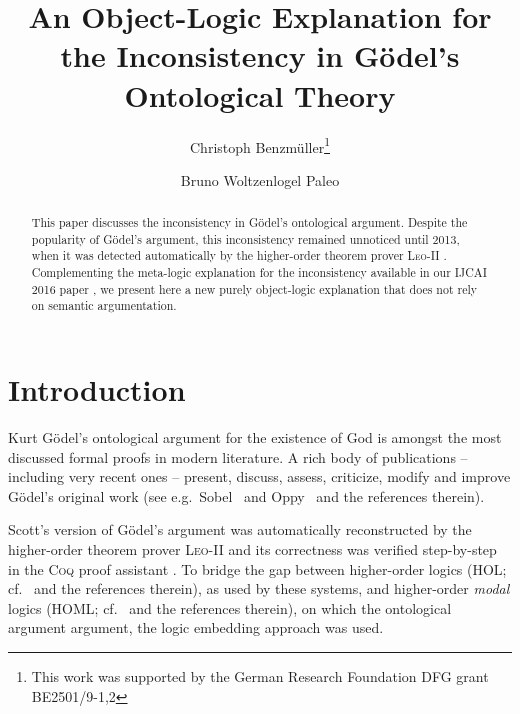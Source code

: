 \documentclass{llncs}
\begin{document}
\title{An Object-Logic Explanation for the Inconsistency in G\"odel's Ontological Theory}
\author{Christoph Benzm\"uller\thanks{This work was supported by
    the German Research Foundation DFG grant BE2501/9-1,2} \and Bruno Woltzenlogel Paleo 
}


\maketitle            



\begin{abstract}
  This paper discusses the 
  inconsistency in G\"odel's
  ontological argument. Despite the popularity of G\"odel's argument, this
  inconsistency remained unnoticed until 2013, 
  when it was detected automatically by the 
  higher-order theorem prover \textsc{Leo-II} \cite{ECAI2014}. Complementing the meta-logic explanation for the inconsistency available in our IJCAI 2016 paper \cite{C55}, we present here a new purely object-logic explanation that does not rely on semantic argumentation.
  
\end{abstract}



\section{Introduction}\label{sec:introduction}
Kurt G\"{o}del's ontological
argument for the existence of God \cite{GoedelNotes,ScottNotes} is
amongst the most discussed formal proofs in modern literature. A rich
body of publications -- including very recent ones -- present,
discuss, assess, criticize, modify and improve G\"{o}del's original
work (see e.g.~Sobel~\cite{sobel2004logic} and Oppy~\cite{sep-ontological-arguments} and the
references therein). 

Scott's version of G\"odel's argument was automatically reconstructed by the higher-order theorem prover \textsc{Leo-II} \cite{C40} and its correctness was verified step-by-step in the \textsc{Coq} proof assistant \cite{CSR}. To bridge the gap between higher-order logics (HOL; cf.~\cite{andrewsSEP} and the references
therein), as used by these systems, and higher-order \emph{modal} logics (HOML; cf.~\cite{homl} and the
references therein), on which the ontological argument argument, the logic embedding approach \cite{J23,C40} was used.
\end{document}
